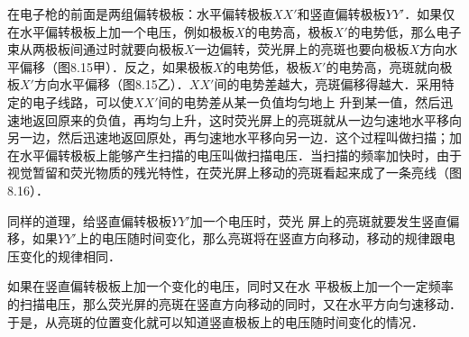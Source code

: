 在电子枪的前面是两组偏转极板：水平偏转极板$XX'$和竖直偏转极板$YY'$．如果仅在水平偏转极板上加一个电压，例如极板$X$的电势高，极板$X'$的电势低，那么电子束从两极板间通过时就要向极板$X$一边偏转，荧光屏上的亮斑也要向极板$X$方向水平偏移（图8.15甲）．反之，如果极板$X$的电势低，极板$X'$的电势高，亮斑就向极板$X'$方向水平偏移（图8.15乙）．$XX'$间的电势差越大，亮斑偏移得越大．采用特定的电子线路，可以使$XX'$间的电势差从某一负值均匀地上
升到某一值，然后迅速地返回原来的负值，再均匀上升，这时荧光屏上的亮斑就从一边匀速地水平移向另一边，然后迅速地返回原处，再匀速地水平移向另一边．这个过程叫做扫描；加在水平偏转极板上能够产生扫描的电压叫做扫描电压．当扫描的频率加快时，由于视觉暂留和荧光物质的残光特性，在荧光屏上移动的亮斑看起来成了一条亮线（图8.16）．
\begin{figure}[htp]
    \centering
    \begin{minipage}[t]{0.48\textwidth}
    \centering
    \caption{}
\end{minipage}
\begin{minipage}[t]{0.48\textwidth}
\centering
    \caption{}
\end{minipage}
\end{figure}

同样的道理，给竖直偏转极板$YY'$加一个电压时，荧光
屏上的亮斑就要发生竖直偏移，如果$YY'$上的电压随时间变化，那么亮斑将在竖直方向移动，移动的规律跟电压变化的规律相同．

如果在竖直偏转极板上加一个变化的电压，同时又在水
平极板上加一个一定频率的扫描电压，那么荧光屏的亮斑在竖直方向移动的同时，又在水平方向匀速移动．于是，从亮斑的位置变化就可以知道竖直极板上的电压随时间变化的情况．

